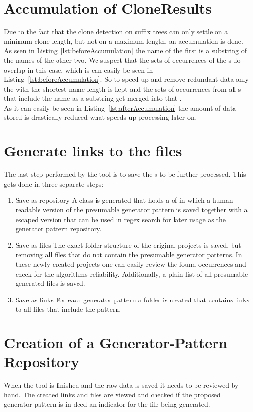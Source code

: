 \section{Accumulation of CloneResults}
Due to the fact that the clone detection on suffix trees can only settle on a minimum clone length, but not on a maximum length, an accumulation is done.\\
As seen in Listing~\ref{lst:beforeAccumulation} the name of the first  is a substring of the names of the other two. We suspect that the sets of occurrences of the s do overlap in this case, which is can easily be seen in Listing~\ref{lst:beforeAccumulation}. So to speed up and remove redundant data only the  with the shortest name length is kept and the sets of occurrences from all s that include the name as a substring get merged into that .\\
As it can easily be seen in Listing~\ref{lst:afterAccumulation} the amount of data stored is drastically reduced what speeds up processing later on.



\section{Generate links to the files}
The last step performed by the tool is to save the s to be further processed. This gets done in three separate steps:
\begin{enumerate}
	\item Save as repository
		\subitem A  class is generated that holds a  of  in which a human readable version of the presumable generator pattern is saved together with a escaped version that can be used in regex search for later usage as the generator pattern repository.
	\item Save as files
		\subitem The exact folder structure of the original projects is saved, but removing all files that do not contain the presumable generator patterns. In these newly created projects one can easily review the found occurrences and check for the algorithms reliability. Additionally, a plain  list of all presumable generated files is saved.
	\item Save as links
		\subitem For each generator pattern a folder is created that contains links to all files that include the pattern.
\end{enumerate} 

\section{Creation of a Generator-Pattern Repository}
When the tool is finished and the raw data is saved it needs to be reviewed by hand. The created links and files are viewed and checked if the proposed generator pattern is in deed an indicator for the file being generated. 











